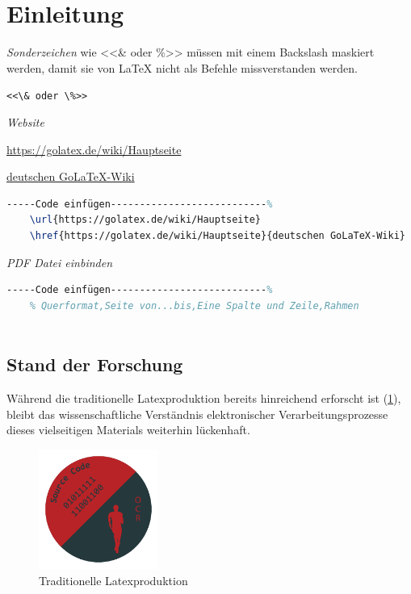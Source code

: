 \clearpage
\section{Einleitung}

\emph{Sonderzeichen}  wie <<\& oder \%>> müssen mit einem Backslash maskiert werden, damit sie von LaTeX nicht als Befehle missverstanden werden.

\verb|<<\& oder \%>>| 

\emph{Website}

\url{https://golatex.de/wiki/Hauptseite} 

\href{https://golatex.de/wiki/Hauptseite}{deutschen GoLaTeX-Wiki}
\begin{lstlisting}[language=TeX,caption={www},label={code:www},% C, TeX, Bash, Python
]-----Code einfügen---------------------------%
	\url{https://golatex.de/wiki/Hauptseite}
	\href{https://golatex.de/wiki/Hauptseite}{deutschen GoLaTeX-Wiki}
\end{lstlisting} 

\emph{PDF Datei einbinden}
\begin{lstlisting}[language=TeX,caption={PDF Datei},label={code:PDF_Datei},% C, TeX, Bash, Python
]-----Code einfügen---------------------------%
	% Querformat,Seite von...bis,Eine Spalte und Zeile,Rahmen
	
\end{lstlisting}




\subsection{Stand der Forschung}

Während die traditionelle Latexproduktion bereits 
hinreichend erforscht ist (\ref{fig:Traditionelle_Latexproduktion}), bleibt das wissenschaftliche Verständnis elektronischer Verarbeitungsprozesse dieses vielseitigen Materials weiterhin lückenhaft. 


\begin{figure}[hb]
	\centering
	\includegraphics[width=0.35\textwidth]{content/bsp/logo.pdf}
	\caption{Traditionelle Latexproduktion}\label{fig:Traditionelle_Latexproduktion}%
\end{figure}


